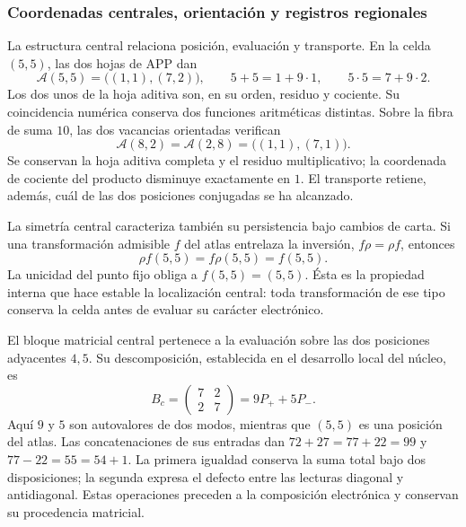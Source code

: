 \subsubsection{Coordenadas centrales, orientación y registros regionales}
\label{el-centro:registros}

La estructura central relaciona posición, evaluación y transporte. En la
celda \((5,5)\), las dos hojas de APP dan
\begin{equation}
 \mathcal A(5,5)=\bigl((1,1),(7,2)\bigr),\qquad
 5+5=1+9\cdot1,\qquad5\cdot5=7+9\cdot2.
 \label{el-centro:app}
\end{equation}
Los dos unos de la hoja aditiva son, en su orden, residuo y cociente.
Su coincidencia numérica conserva dos funciones aritméticas distintas.
Sobre la fibra de suma \(10\), las dos vacancias orientadas verifican
\begin{equation}
 \mathcal A(8,2)=\mathcal A(2,8)=\bigl((1,1),(7,1)\bigr).
 \label{el-centro:vacancias}
\end{equation}
Se conservan la hoja aditiva completa y el residuo multiplicativo;
la coordenada de cociente del producto disminuye exactamente en
\(1\). El transporte retiene, además, cuál de las dos posiciones
conjugadas se ha alcanzado.



La simetría central caracteriza también su persistencia bajo cambios de
carta. Si una transformación admisible \(f\) del atlas entrelaza la
inversión, \(f\rho=\rho f\), entonces
\[
 \rho f(5,5)=f\rho(5,5)=f(5,5).
\]
La unicidad del punto fijo obliga a \(f(5,5)=(5,5)\). Ésta es la
propiedad interna que hace estable la localización central: toda
transformación de ese tipo conserva la celda antes de evaluar su
carácter electrónico\cite{hmtedicionintegral}.

El bloque matricial central pertenece a la evaluación sobre las dos
posiciones adyacentes \(4,5\). Su descomposición, establecida en el
desarrollo local del núcleo, es
\[
 B_c=\begin{pmatrix}7&2\\2&7\end{pmatrix}=9P_++5P_-.
\]
Aquí \(9\) y \(5\) son autovalores de dos modos, mientras que
\((5,5)\) es una posición del atlas. Las concatenaciones de sus
entradas dan \(72+27=77+22=99\) y
\(77-22=55=54+1\). La primera igualdad conserva la suma total bajo
dos disposiciones; la segunda expresa el defecto entre las lecturas
diagonal y antidiagonal. Estas operaciones preceden a la composición
electrónica y conservan su procedencia matricial.

